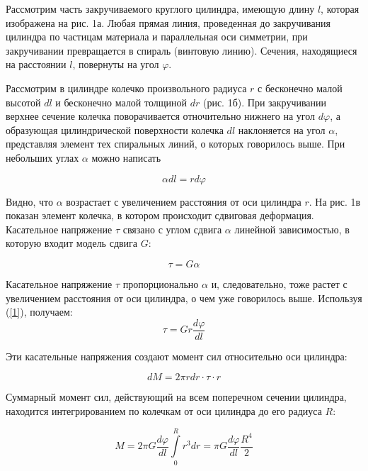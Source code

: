 \documentclass[12pt,a4paper]{article}
\begin{document}
Рассмотрим часть закручиваемого круглого цилиндра, имеющую длину $l$, которая изображена на рис. 1а. Любая прямая линия, проведенная до закручивания цилиндра по частицам материала и параллельная оси симметрии, при закручивании превращается в спираль (винтовую линию). Сечения, находящиеся на расстоянии $l$, повернуты на угол $\varphi$.

Рассмотрим в цилиндре колечко произвольного радиуса $r$ с бесконечно малой высотой $dl$ и бесконечно малой толщиной $dr$ (рис. 1б). При закручивании верхнее сечение колечка поворачивается отночительно нижнего на угол $d\varphi$, а образующая цилиндрической поверхности колечка $dl$ наклоняется на угол $\alpha$, представляя элемент тех спиральных линий, о которых говорилось выше. При небольших углах $\alpha$ можно написать

\begin{equation}\label{1}
    \alpha dl = rd\varphi 
\end{equation}

Видно, что $\alpha$ возрастает с увеличением расстояния от оси цилиндра $r$. На рис. 1в показан элемент колечка, в котором происходит сдвиговая деформация. Касательное напряжение $\tau$ связано с углом сдвига $\alpha$ линейной зависимостью, в которую входит модель сдвига $G$:

\begin{equation}\label{2}
    \tau = G\alpha
\end{equation}

Касательное напряжение $\tau$ пропорционально $\alpha$ и, следовательно, тоже растет с увеличением расстояния от оси цилиндра, о чем уже говорилось выше. Используя (\ref{1}), получаем:
\begin{equation}\label{3}
    \tau = Gr\frac{d\varphi}{dl}
\end{equation}

Эти касательные напряжения создают момент сил относительно оси цилиндра:

\begin{equation}\label{4}
    dM = 2\pi rdr\cdot\tau\cdot r
\end{equation}

Суммарный момент сил, действующий на всем поперечном сечении цилиндра, находится интегрированием по колечкам от оси цилиндра до его радиуса $R$:

\begin{equation}\label{5}
    M = 2\pi G\frac{d\varphi}{dl}\int\limits_0^R r^3 dr = \pi G \frac{d\varphi}{dl}\frac{R^4}{2}
\end{equation}
\end{document}
